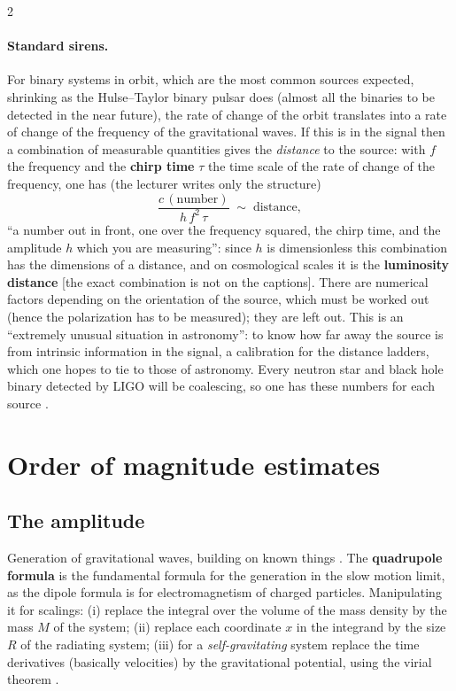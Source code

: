 \begin{paracol}{2}
\paragraph{Standard sirens.} For binary systems in orbit, which are the most common sources expected, shrinking as the Hulse--Taylor binary pulsar does (almost all the binaries to be detected in the near future), the rate of change of the orbit translates into a rate of change of the frequency of the gravitational waves. If this is in the signal then a combination of measurable quantities gives the \emph{distance} to the source: with $f$ the frequency and the \textbf{chirp time} $\tau$ the time scale of the rate of change of the frequency, one has (the lecturer writes only the structure)
\[
  \frac{c\,(\text{number})}{h\,f^{2}\,\tau}\;\sim\;\text{distance},
\]
``a number out in front, one over the frequency squared, the chirp time, and the amplitude $h$ which you are measuring'': since $h$ is dimensionless this combination has the dimensions of a distance, and on cosmological scales it is the \textbf{luminosity distance} [the exact combination is not on the captions]. There are numerical factors depending on the orientation of the source, which must be worked out (hence the polarization has to be measured); they are left out. This is an ``extremely unusual situation in astronomy'': to know how far away the source is from intrinsic information in the signal, a calibration for the distance ladders, which one hopes to tie to those of astronomy. Every neutron star and black hole binary detected by LIGO will be coalescing, so one has these numbers for each source .

\section{Order of magnitude estimates}\label{sec:c27-estimates}

\subsection{The amplitude}

Generation of gravitational waves, building on known things . The \textbf{quadrupole formula} is the fundamental formula for the generation in the slow motion limit, as the dipole formula is for electromagnetism of charged particles. Manipulating it for scalings: (i) replace the integral over the volume of the mass density by the mass $M$ of the system; (ii) replace each coordinate $x$ in the integrand by the size $R$ of the radiating system; (iii) for a \emph{self-gravitating} system replace the time derivatives (basically velocities) by the gravitational potential, using the virial theorem .


\end{paracol}

